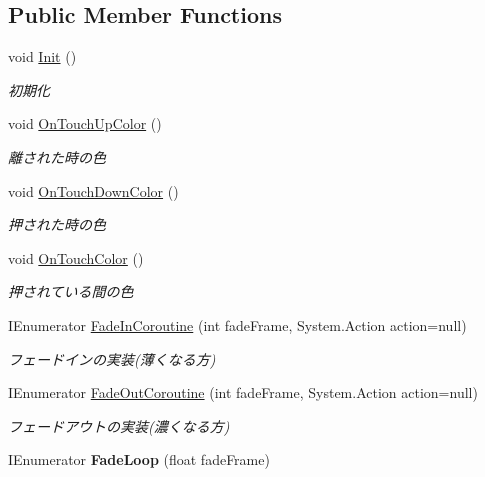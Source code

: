 \subsection*{Public Member Functions}
\begin{DoxyCompactItemize}
\item 
void \hyperlink{class_t_m_p_text_a2d797081623096feb8ec75c70872e8d2}{Init} ()
\begin{DoxyCompactList}\small\item\em 初期化 \end{DoxyCompactList}\item 
void \hyperlink{class_t_m_p_text_a7c1368d627b685be673316d2c41c00f6}{On\+Touch\+Up\+Color} ()
\begin{DoxyCompactList}\small\item\em 離された時の色 \end{DoxyCompactList}\item 
void \hyperlink{class_t_m_p_text_a429ef413d5ca865e547ac4ef6ca41121}{On\+Touch\+Down\+Color} ()
\begin{DoxyCompactList}\small\item\em 押された時の色 \end{DoxyCompactList}\item 
void \hyperlink{class_t_m_p_text_aafc12bdbbc7023761e6a42838375caa1}{On\+Touch\+Color} ()
\begin{DoxyCompactList}\small\item\em 押されている間の色 \end{DoxyCompactList}\item 
I\+Enumerator \hyperlink{class_t_m_p_text_a5194208ad9e965ef394335cc1c79b5e5}{Fade\+In\+Coroutine} (int fade\+Frame, System.\+Action action=null)
\begin{DoxyCompactList}\small\item\em フェードインの実装(薄くなる方) \end{DoxyCompactList}\item 
I\+Enumerator \hyperlink{class_t_m_p_text_a222dd1486fb0d17658b402c3388238e9}{Fade\+Out\+Coroutine} (int fade\+Frame, System.\+Action action=null)
\begin{DoxyCompactList}\small\item\em フェードアウトの実装(濃くなる方) \end{DoxyCompactList}\item 
I\+Enumerator {\bfseries Fade\+Loop} (float fade\+Frame)\hypertarget{class_t_m_p_text_a4239f8b3a2f164cb099892840c70d34a}{}\label{class_t_m_p_text_a4239f8b3a2f164cb099892840c70d34a}

\end{DoxyCompactItemize}
